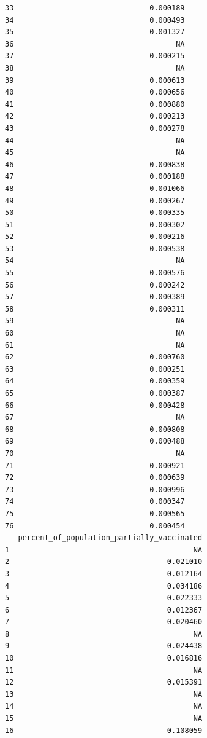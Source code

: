 \documentclass[
  letterpaper,
  DIV=11,
  numbers=noendperiod]{scrartcl}
\begin{document}
\begin{verbatim}
33                               0.000189
34                               0.000493
35                               0.001327
36                                     NA
37                               0.000215
38                                     NA
39                               0.000613
40                               0.000656
41                               0.000880
42                               0.000213
43                               0.000278
44                                     NA
45                                     NA
46                               0.000838
47                               0.000188
48                               0.001066
49                               0.000267
50                               0.000335
51                               0.000302
52                               0.000216
53                               0.000538
54                                     NA
55                               0.000576
56                               0.000242
57                               0.000389
58                               0.000311
59                                     NA
60                                     NA
61                                     NA
62                               0.000760
63                               0.000251
64                               0.000359
65                               0.000387
66                               0.000428
67                                     NA
68                               0.000808
69                               0.000488
70                                     NA
71                               0.000921
72                               0.000639
73                               0.000996
74                               0.000347
75                               0.000565
76                               0.000454
   percent_of_population_partially_vaccinated
1                                          NA
2                                    0.021010
3                                    0.012164
4                                    0.034186
5                                    0.022333
6                                    0.012367
7                                    0.020460
8                                          NA
9                                    0.024438
10                                   0.016816
11                                         NA
12                                   0.015391
13                                         NA
14                                         NA
15                                         NA
16                                   0.108059

\end{verbatim}
\end{document}
